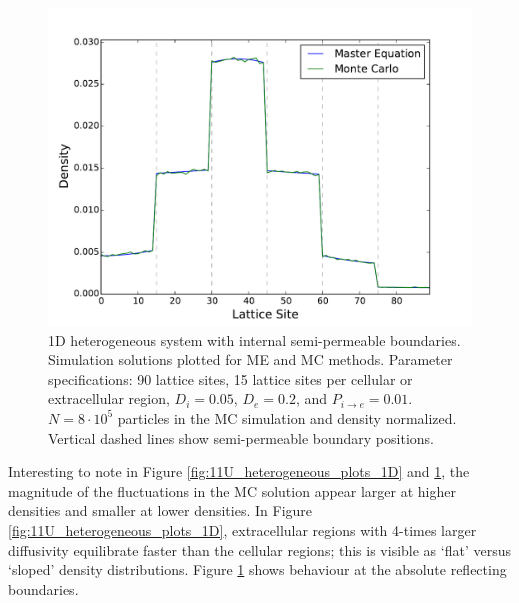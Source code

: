	\begin{figure}[h]
		\centering
		\includegraphics[width=1.0\linewidth]{../images/1D/3U_heterogeneous_plots_1D}
		\caption{1D heterogeneous system with internal semi-permeable boundaries. Simulation solutions plotted for ME and MC methods. Parameter specifications: 90 lattice sites, 15 lattice sites per cellular or extracellular region, $ D_i = 0.05 $, $ D_e = 0.2 $, and $ P_{i\rightarrow e} = 0.01 $. $ N = 8 \cdot 10^5 $ particles in the MC simulation and density normalized. Vertical dashed lines show semi-permeable boundary positions.}
		\label{fig:3U_heterogeneous_plots_1D}
	\end{figure}
	
	\newpage
	Interesting to note in Figure \ref{fig:11U_heterogeneous_plots_1D} and \ref{fig:3U_heterogeneous_plots_1D}, the magnitude of the fluctuations in the MC solution appear larger at higher densities and smaller at lower densities. In Figure \ref{fig:11U_heterogeneous_plots_1D}, extracellular regions with 4-times larger diffusivity equilibrate faster than the cellular regions; this is visible as `flat' versus `sloped' density distributions. Figure \ref{fig:3U_heterogeneous_plots_1D} shows behaviour at the absolute reflecting boundaries.
	
